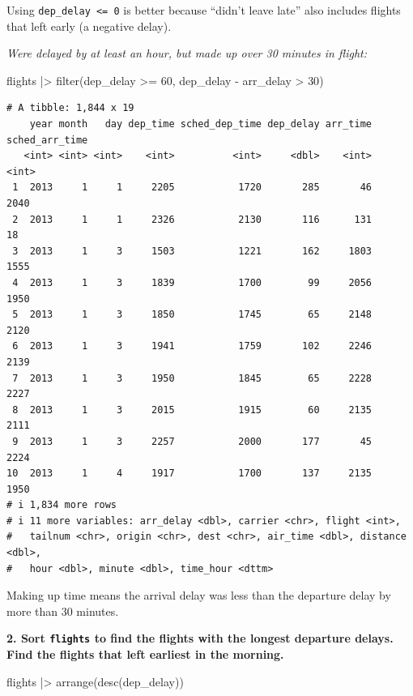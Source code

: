 \documentclass[
  letterpaper,
  DIV=11,
  numbers=noendperiod]{scrreprt}
\newenvironment{Shaded}{\begin{snugshade}}{\end{snugshade}}
\newcommand{\DecValTok}[1]{\textcolor[rgb]{0.68,0.00,0.00}{#1}}
\newcommand{\FunctionTok}[1]{\textcolor[rgb]{0.28,0.35,0.67}{#1}}
\newcommand{\NormalTok}[1]{\textcolor[rgb]{0.00,0.23,0.31}{#1}}
\newcommand{\SpecialCharTok}[1]{\textcolor[rgb]{0.37,0.37,0.37}{#1}}
\begin{document}
Using \texttt{dep\_delay\ \textless{}=\ 0} is better because ``didn't
leave late'' also includes flights that left early (a negative delay).

\emph{Were delayed by at least an hour, but made up over 30 minutes in
flight:}

\begin{Shaded}
\begin{Highlighting}[]
\NormalTok{flights }\SpecialCharTok{|\textgreater{}}
  \FunctionTok{filter}\NormalTok{(dep\_delay }\SpecialCharTok{\textgreater{}=} \DecValTok{60}\NormalTok{, dep\_delay }\SpecialCharTok{{-}}\NormalTok{ arr\_delay }\SpecialCharTok{\textgreater{}} \DecValTok{30}\NormalTok{)}
\end{Highlighting}
\end{Shaded}

\begin{verbatim}
# A tibble: 1,844 x 19
    year month   day dep_time sched_dep_time dep_delay arr_time sched_arr_time
   <int> <int> <int>    <int>          <int>     <dbl>    <int>          <int>
 1  2013     1     1     2205           1720       285       46           2040
 2  2013     1     1     2326           2130       116      131             18
 3  2013     1     3     1503           1221       162     1803           1555
 4  2013     1     3     1839           1700        99     2056           1950
 5  2013     1     3     1850           1745        65     2148           2120
 6  2013     1     3     1941           1759       102     2246           2139
 7  2013     1     3     1950           1845        65     2228           2227
 8  2013     1     3     2015           1915        60     2135           2111
 9  2013     1     3     2257           2000       177       45           2224
10  2013     1     4     1917           1700       137     2135           1950
# i 1,834 more rows
# i 11 more variables: arr_delay <dbl>, carrier <chr>, flight <int>,
#   tailnum <chr>, origin <chr>, dest <chr>, air_time <dbl>, distance <dbl>,
#   hour <dbl>, minute <dbl>, time_hour <dttm>
\end{verbatim}

Making up time means the arrival delay was less than the departure delay
by more than 30 minutes.

\textbf{2. Sort \texttt{flights} to find the flights with the longest
departure delays. Find the flights that left earliest in the morning.}

\begin{Shaded}
\begin{Highlighting}[]
\NormalTok{flights }\SpecialCharTok{|\textgreater{}}
  \FunctionTok{arrange}\NormalTok{(}\FunctionTok{desc}\NormalTok{(dep\_delay))}
\end{Highlighting}
\end{Shaded}
\end{document}
